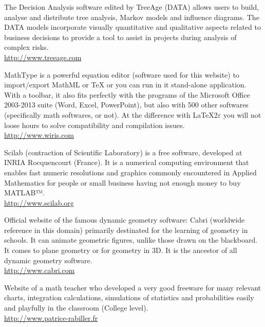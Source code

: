 	{\Large {}}{\Large {}}{\Large {}}{\Large {}} The Decision Analysis software edited by TreeAge (DATA) allows users to build, analyse and distribute tree analysis, Markov models and influence diagrams. The DATA models incorporate visually quantitative and qualitative aspects related to business decisions to provide a tool to assist in projects during analysis of complex risks.\\
	\href{http://www.treeage.com}{\color{blue}http://www.treeage.com}
	
	{\Large {}}{\Large {}}{\Large {}}{\Large {}} MathType is a powerful equation editor (software used for this website) to import/export MathML or TeX or you can run in it stand-alone application. With a toolbar, it also fits perfectly with the programs of the Microsoft Office 2003-2013 suite (Word, Excel, PowerPoint), but also with 500 other softwares (specifically math softwares, or not). At the difference with \LaTeX 2$\varepsilon$ you will not loose hours to solve compatibility and compilation issues.\\ 
	\href{http://www.wiris.com}{\color{blue}http://www.wiris.com}
	
	{\Large {}}{\Large {}}{\Large {}} Scilab (contraction of Scientific Laboratory) is a free software, developed at INRIA Rocquencourt (France). It is a numerical computing environment that enables fast numeric resolutions and graphics commonly encountered in Applied Mathematics for people or small business having not enough money to buy MATLAB™.\\
	\href{http://www.scilab.org}{\color{blue}http://www.scilab.org}
	
	{\Large {}}{\Large {}} Official website of the famous dynamic geometry software: Cabri (worldwide reference in this domain) primarily destinated for the learning of geometry in schools. It can animate geometric figures, unlike those drawn on the blackboard. It comes to plane geometry or for geometry in 3D. It is the ancestor of all dynamic geometry software.\\
	\href{http://www.cabri.com}{\color{blue}http://www.cabri.com}
	
	{\Large {}}{\Large {}}{\Large {}}\bcdfrance{} Website of a math teacher who developed a very good freeware for many relevant charts, integration calculations, simulations of statistics and probabilities easily and playfully in the classroom (College level).\\
	\href{http://www.patrice-rabiller.fr}{\color{blue}http://www.patrice-rabiller.fr}
	

